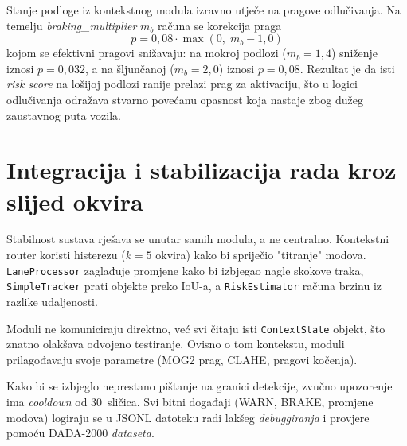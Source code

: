 Stanje podloge iz kontekstnog modula izravno utječe na pragove odlučivanja. Na temelju \textit{braking\_multiplier} $m_b$ računa se korekcija praga
\begin{equation}
    p = 0{,}08 \cdot \max(0,\; m_b - 1{,}0)
\end{equation}
kojom se efektivni pragovi snižavaju: na mokroj podlozi ($m_b = 1{,}4$) sniženje iznosi $p = 0{,}032$, a na šljunčanoj ($m_b = 2{,}0$) iznosi $p = 0{,}08$. Rezultat je da isti \textit{risk score} na lošijoj podlozi ranije prelazi prag za aktivaciju, što u logici odlučivanja odražava stvarno povećanu opasnost koja nastaje zbog dužeg zaustavnog puta vozila.


\section{Integracija i stabilizacija rada kroz slijed okvira}
Stabilnost sustava rješava se unutar samih modula, a ne centralno. Kontekstni router koristi histerezu ($k = 5$ okvira) kako bi spriječio "titranje" modova. \texttt{LaneProcessor} zaglađuje promjene kako bi izbjegao nagle skokove traka, \texttt{SimpleTracker} prati objekte preko IoU-a, a \texttt{RiskEstimator} računa brzinu iz razlike udaljenosti.

Moduli ne komuniciraju direktno, već svi čitaju isti \texttt{ContextState} objekt, što znatno olakšava odvojeno testiranje. Ovisno o tom kontekstu, moduli prilagođavaju svoje parametre (MOG2 prag, CLAHE, pragovi kočenja).

Kako bi se izbjeglo neprestano pištanje na granici detekcije, zvučno upozorenje ima \textit{cooldown} od 30~sličica. Svi bitni događaji (WARN, BRAKE, promjene modova) logiraju se u JSONL datoteku radi lakšeg \textit{debuggiranja} i provjere pomoću DADA-2000 \textit{dataseta}.
